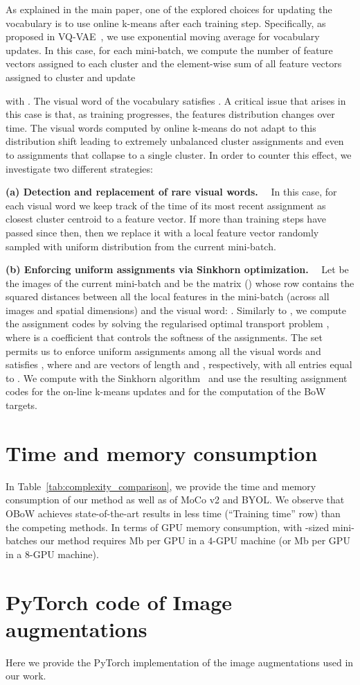 \documentclass[final]{cvpr}
\newcommand{\parag}[1]{\smallskip\noindent\textbf{#1}~~}
\begin{document}
As explained in the main paper, one of the explored choices for updating the vocabulary is to use online k-means after each training step.
Specifically, as proposed in VQ-VAE~\cite{oord2017neural, razavi2019generating}, 
we use exponential moving average for vocabulary updates.
In this case, for each mini-batch, we compute the number  of feature vectors assigned to each cluster  and  the element-wise sum of all feature vectors assigned to cluster  and update

with . The  visual word of the vocabulary  satisfies .
A critical issue that arises in this case is that, as training progresses, the features distribution changes over time. The visual words computed by online k-means do not adapt to this distribution shift leading to extremely unbalanced cluster assignments and even to assignments that collapse to a single cluster. In order to counter this effect, we investigate two different strategies: 

\parag{(a) Detection and replacement of rare visual words.}
In this case, for each visual word we keep track of the time of its most recent assignment as closest cluster centroid to a feature vector.
If more than  training steps have passed since then, then we replace it with a local feature vector randomly sampled with uniform distribution from the current mini-batch.

\parag{(b) Enforcing uniform assignments via Sinkhorn optimization.}
Let  be the  images of the current mini-batch and  be the  matrix () whose  row  contains the squared distances between all the local features in the mini-batch (across all images and spatial dimensions) and the  visual word: . 
Similarly to \cite{asano2019selflabelling,caron2020unsupervised}, 
we compute the assignment codes by solving the regularised optimal transport problem
,
where  is a coefficient that controls the softness of the assignments. 
The set  permits us to enforce uniform assignments among all the visual words and satisfies
,
where  and  are vectors of length  and , respectively, with all entries equal to . 
We compute  with the Sinkhorn algorithm~\cite{cuturi2013sinkhorn} and use the resulting assignment codes for the on-line k-means updates and for the computation of the BoW targets.


\section{Time and memory consumption}

In Table~\ref{tab:complexity_comparison}, we provide the time and memory consumption of our method as well as of MoCo v2 and BYOL.
We observe that OBoW achieves state-of-the-art results in less time (``Training time'' row) than the competing methods.
In terms of GPU memory consumption, with -sized mini-batches our method requires Mb per GPU in a 4-GPU machine (or Mb per GPU in a 8-GPU machine).

 
\onecolumn


\clearpage
\onecolumn
\section{PyTorch code of Image augmentations} \label{sec:aug_pytorch}
Here we provide the PyTorch implementation of the image augmentations used in our work.
 
\end{document}
